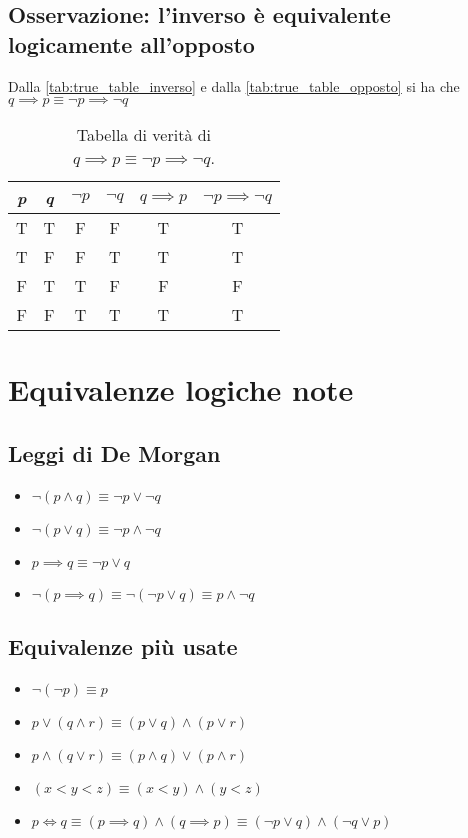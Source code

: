 \subsection{Osservazione: l'inverso è equivalente logicamente all'opposto}
Dalla \autoref{tab:true_table_inverso} e dalla \autoref{tab:true_table_opposto} si ha che $q \implies p \equiv \neg p \implies \neg q$
\begin{table}[H]
    \centering    
    \caption{\label{tab:true_table_inverso_eqlogic_opposto}Tabella di verità di $q \implies p \equiv \neg p \implies \neg q$.}
    \begin{tabular}{|c | c | c | c | c || c ||} 
     \hline
     \textit{p} & \textit{q} & $\neg p$ & $\neg q$ & $q \implies p$ & $\neg p \implies \neg q$ \\
     \hline\hline
     T & T & F & F & T & T\\ 
     \hline
     T & F & F & T & T & T\\
     \hline
     F & T & T & F & F & F\\
     \hline
     F & F & T & T & T & T\\
     \hline
    \end{tabular}
\end{table}

\section{Equivalenze logiche note}
\subsection{Leggi di De Morgan}
\label{subs:de_morgan_laws}
\begin{itemize}
    \item $\neg(p \wedge q) \equiv \neg p \vee \neg q$
    \item $\neg(p \vee q) \equiv \neg p \wedge \neg q$
    \item $p \implies q \equiv \neg p \vee q$
    \item $\neg(p \implies q) \equiv \neg(\neg p \vee q) \equiv p \wedge \neg q$
\end{itemize}

\subsection{Equivalenze più usate}
\begin{itemize}
    \item $\neg(\neg p) \equiv p$
    \item $p \vee (q \wedge r) \equiv (p \vee q) \wedge (p \vee r)$
    \item $p \wedge (q \vee r) \equiv (p \wedge q) \vee (p \wedge r)$
    \item $(x < y < z) \equiv (x < y) \wedge (y < z)$
    \item $p \iff q \equiv (p \implies q) \wedge (q \implies p) \equiv (\neg p \vee q) \wedge (\neg q \vee p)$
\end{itemize}

